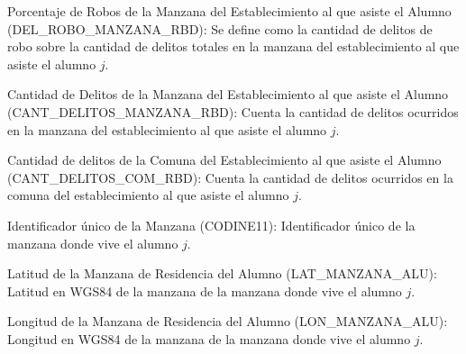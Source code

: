\begin{longdescription}
\begin{longdescription}
        \item[Porcentaje de Robos de la Manzana del Establecimiento al que asiste el Alumno](DEL\_ROBO\_MANZANA\_RBD):
        Se define como la cantidad de delitos de robo sobre la cantidad de delitos totales en la manzana del establecimiento al que asiste el alumno $j$.
        
        \item[Cantidad de Delitos de la Manzana del Establecimiento al que asiste el Alumno](CANT\_DELITOS\_MANZANA\_RBD): Cuenta la cantidad de delitos ocurridos en la manzana del establecimiento al que asiste el alumno $j$.
        
        \item[Cantidad de delitos de la Comuna del Establecimiento al que asiste el Alumno](CANT\_DELITOS\_COM\_RBD): Cuenta la cantidad de delitos ocurridos en la comuna del establecimiento al que asiste el alumno $j$.
        
        \item[Identificador único de la Manzana](CODINE11): Identificador único de la manzana donde vive el alumno $j$.
        
        \item[Latitud de la Manzana de Residencia del Alumno](LAT\_MANZANA\_ALU): Latitud en WGS84 de la manzana de la manzana donde vive el alumno $j$.
        
        \item[Longitud de la Manzana de Residencia del Alumno](LON\_MANZANA\_ALU):
        Longitud en WGS84 de la manzana de la manzana donde vive el alumno $j$.
        
    \end{longdescription}
\end{longdescription}